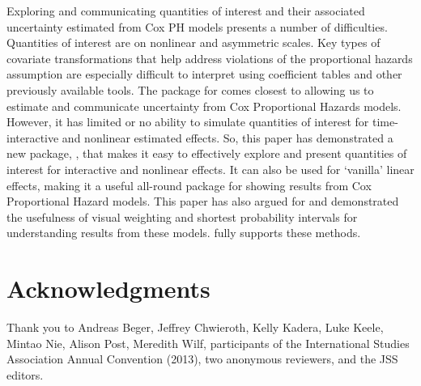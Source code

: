 \documentclass[nojss]{jss}\usepackage[]{graphicx}\usepackage[]{color}
\begin{document}
Exploring and communicating quantities of interest and their associated uncertainty estimated from Cox PH models presents a number of difficulties. Quantities of interest are on nonlinear and asymmetric scales. Key types of covariate transformations that help address violations of the proportional hazards assumption are especially difficult to interpret using coefficient tables and other previously available tools. The  package for  comes closest to allowing us to estimate and communicate uncertainty from Cox Proportional Hazards models. However, it has limited or no ability to simulate quantities of interest for time-interactive and nonlinear estimated effects. So, this paper has demonstrated a new  package, , that makes it easy to effectively explore and present quantities of interest for interactive and nonlinear effects. It can also be used for `vanilla' linear effects, making it a useful all-round package for showing results from Cox Proportional Hazard models. This paper has also argued for and demonstrated the usefulness of visual weighting and shortest probability intervals for understanding results from these models.  fully supports these methods.

\section*{Acknowledgments}
Thank you to Andreas Beger, Jeffrey Chwieroth, Kelly Kadera, Luke Keele, Mintao Nie, Alison Post, Meredith Wilf, participants of the International Studies Association Annual Convention (2013), two anonymous reviewers, and the JSS editors.


\end{document}
